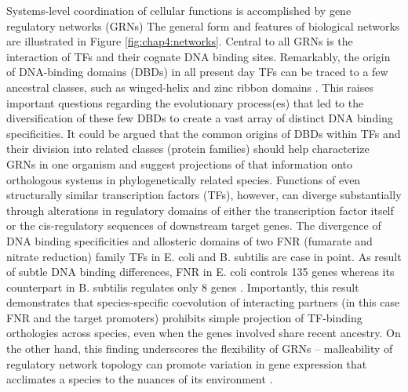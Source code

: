 Systems-level coordination of cellular functions is accomplished by gene regulatory networks (GRNs) \cite{mcadams_evolution_2004}  The general form and features of biological networks are illustrated in Figure \ref{fig:chap4:networks}. Central to all GRNs is the interaction of TFs and their cognate DNA binding sites.  Remarkably, the origin of DNA-binding domains (DBDs) in all present day TFs can be traced to a few ancestral classes, such as winged-helix and zinc ribbon domains \cite{babu_structure_2004}.  This raises important questions regarding the evolutionary process(es) that led to the diversification of these few DBDs to create a vast array of distinct DNA binding specificities.  It could be argued that the common origins of DBDs within TFs and their division into related classes (protein families) should help characterize GRNs in one organism and suggest projections of that information onto orthologous systems in phylogenetically related species.  Functions of even structurally similar transcription factors (TFs), however, can diverge substantially through alterations in regulatory domains of either the transcription factor itself or the cis-regulatory sequences of downstream target genes. The divergence of DNA binding specificities and allosteric domains of two FNR (fumarate and nitrate reduction) family TFs in E. coli and B. subtilis are case in point.  As result of subtle DNA binding differences, FNR in E. coli controls 135 genes whereas its counterpart in B. subtilis regulates only 8 genes \cite{lozada-chavez_role_2008}.  Importantly, this result demonstrates that species-specific coevolution of interacting partners (in this case FNR and the target promoters) prohibits simple projection of TF-binding orthologies across species, even when the genes involved share recent ancestry.  On the other hand, this finding underscores the flexibility of GRNs – malleability of regulatory network topology can promote variation in gene expression that acclimates a species to the nuances of its environment \cite{lopez-maury_tuning_2008}.

